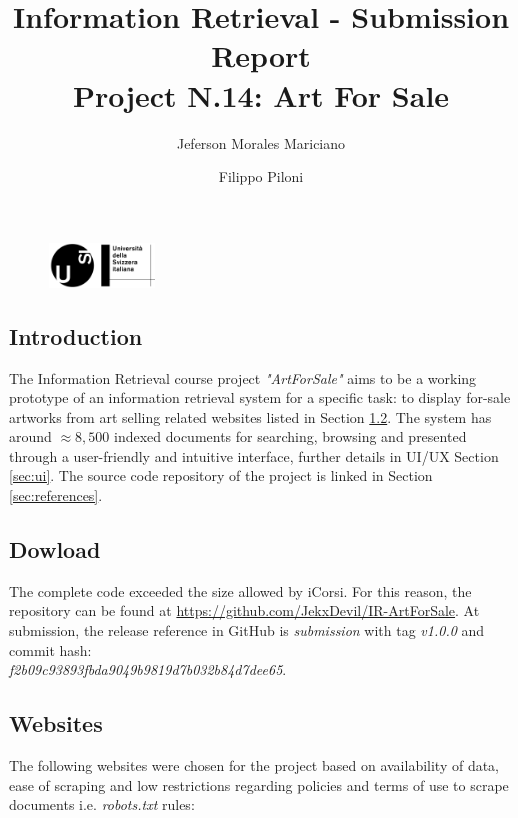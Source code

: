 \documentclass[12pt]{spieman}  %
\title{Information Retrieval - Submission Report \\Project N.14: Art For Sale}
\author{Jeferson Morales Mariciano}
\author{Filippo Piloni}
\affil{Università della Svizzera italiana, Faculty of Informatics, Lugano, Switzerland}
\begin{document}
\begin{figure}
    \includegraphics[width=0.25\textwidth, trim={0cm 0cm 0cm 7cm}]{USI_logo.png}
\end{figure}

\maketitle
\tableofcontents
\newpage

\begin{spacing}{1}   %

    \section{Introduction}
    The Information Retrieval course project \textit{"ArtForSale"} aims to be a working prototype of an
    information retrieval system for a specific task: to display for-sale artworks from art selling related
    websites listed in Section \ref{sec:websites}.
    The system has around $\approx 8,500$ indexed documents for searching, browsing and presented through a
    user-friendly and intuitive interface, further details in UI/UX Section \ref{sec:ui}.
    The source code repository of the project is linked in Section \ref{sec:references}.

    \subsection{Dowload}
    The complete code exceeded the size allowed by iCorsi.
    For this reason, the repository can be found at
    \url{https://github.com/JekxDevil/IR-ArtForSale}.
    At submission, the release reference in GitHub is \textit{submission}
    with tag \textit{v1.0.0}
    and commit hash:\\ \textit{f2b09c93893fbda9049b9819d7b032b84d7dee65}.

    \subsection{Websites}\label{sec:websites}
    The following websites were chosen for the project based on availability of data, ease of scraping and
    low restrictions regarding policies and terms of use to scrape documents i.e. \textit{robots.txt} rules:


\end{spacing}
\end{document}
